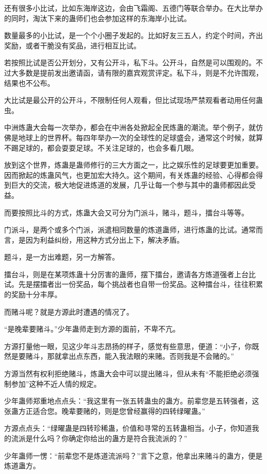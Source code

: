 \begin{this_body}
还有很多小比试，比如东海岸这边，会由飞霜阁、五德门等联合举办。在大比举办的同时，淘汰下来的蛊师们也会参加这样的东海岸小比试。

数量最多的小比试，是一个个小圈子发起的。比如好友三五人，约定个时间，齐出奖励，或者干脆没有奖品，进行相互比试。

若按照比试是否公开划分，又有公开斗，私下斗。公开斗，自然是可以围观的。不过大多数是提前发出邀请函，请有限的嘉宾观赏评定。私下斗，则是不允许围观，结果也不公布。

大比试是最公开的公开斗，不限制任何人观看，但比试现场严禁观看者动用任何蛊虫。

中洲炼蛊大会每一次举办，都会在中洲各处掀起全民炼蛊的潮流。举个例子，就仿佛是地球上的世界杯。每四年举办一次的全球性的足球盛会，通常这个时候，就算不踢足球的，都会耍耍足球。不关注足球的，也会多看几眼。

放到这个世界，炼蛊是蛊师修行的三大方面之一，比之娱乐性的足球要更加重要。因而掀起的炼蛊风气，也更加宏大持久。这个期间，有关炼蛊的经验、心得都会得到巨大的交流，极大地促进炼道的发展，几乎让每一个参与其中的蛊师都因此受益。

而要按照比斗的方式，炼蛊大会又可分为门派斗，赌斗，题斗，擂台斗等等。

门派斗，是两个或多个门派，派遣相同数量的炼道蛊师，进行炼蛊的比试。通常而言，是因为利益纠纷，用这种方式分出上下，解决矛盾。

题斗，是一方出难题，另一方解答。

擂台斗，则是在某项炼蛊十分厉害的蛊师，摆下擂台，邀请各方炼道强者上台比试。先是摆擂者出一份奖品，每个挑战者也自带一份奖品。这种擂台斗，往往积累的奖励十分丰厚。

而赌斗呢？就是方源此时遭遇的情况了。

“是晚辈要赌斗。”少年蛊师走到方源的面前，不卑不亢。

方源打量他一眼，见这少年斗志昂扬的样子，感觉有些意思，便道：“小子，你既然是要赌斗，那就拿出点东西，能入我法眼的来赌。否则我是不会赌的。”

方源当然有权利拒绝赌斗，炼蛊大会中可以提出赌斗，但从未有“不能拒绝必须强制参加”这种不近人情的规定。

少年蛊师郑重地点点头：“我这里有一张五转蛊虫的蛊方。前辈您是五转强者，这张蛊方正适合您。晚辈要赌的，则是您曾经赢得的四转绿曜蛊。”

方源点点头：“绿曜蛊是四转珍稀蛊，价值和寻常的五转蛊相当。小子，你知道我的流派是什么吗？你确定你给出的蛊方是符合我流派的？”

少年蛊师一愣：“前辈您不是炼道流派吗？”言下之意，他拿出来赌斗的蛊方，便是炼道蛊方。


\end{this_body}
